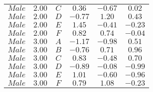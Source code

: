 \begin{tabular}{cccccc}
$Male$ & $2.00$ & $C$ & $0.36$ & $-0.67$ & $0.02$\\
$Male$ & $2.00$ & $D$ & $-0.77$ & $1.20$ & $0.43$\\
$Male$ & $2.00$ & $E$ & $1.45$ & $-0.41$ & $-0.23$\\
$Male$ & $2.00$ & $F$ & $0.82$ & $0.74$ & $-0.04$\\
$Male$ & $3.00$ & $A$ & $-1.17$ & $-0.98$ & $0.51$\\
$Male$ & $3.00$ & $B$ & $-0.76$ & $0.71$ & $0.96$\\
$Male$ & $3.00$ & $C$ & $0.83$ & $-0.48$ & $0.70$\\
$Male$ & $3.00$ & $D$ & $-0.89$ & $-0.08$ & $-0.99$\\
$Male$ & $3.00$ & $E$ & $1.01$ & $-0.60$ & $-0.96$\\
$Male$ & $3.00$ & $F$ & $0.79$ & $1.08$ & $-0.23$\\
\end{tabular}
